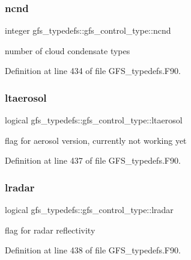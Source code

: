 \subsubsection{ncnd}
{\footnotesize\ttfamily integer gfs\+\_\+typedefs\+::gfs\+\_\+control\+\_\+type\+::ncnd}



number of cloud condensate types 



Definition at line 434 of file G\+F\+S\+\_\+typedefs.\+F90.

\mbox{\label{structgfs__typedefs_1_1gfs__control__type_a0c6be2b33d56b2d3727629f13dccef80}} 
\subsubsection{ltaerosol}
{\footnotesize\ttfamily logical gfs\+\_\+typedefs\+::gfs\+\_\+control\+\_\+type\+::ltaerosol}



flag for aerosol version, currently not working yet 



Definition at line 437 of file G\+F\+S\+\_\+typedefs.\+F90.

\mbox{\label{structgfs__typedefs_1_1gfs__control__type_a479a0746795111467dc198f82522afc3}} 
\subsubsection{lradar}
{\footnotesize\ttfamily logical gfs\+\_\+typedefs\+::gfs\+\_\+control\+\_\+type\+::lradar}



flag for radar reflectivity 



Definition at line 438 of file G\+F\+S\+\_\+typedefs.\+F90.

\mbox{\label{structgfs__typedefs_1_1gfs__control__type_a14c755a9e45ff665f1471153780dc1d5}} 
